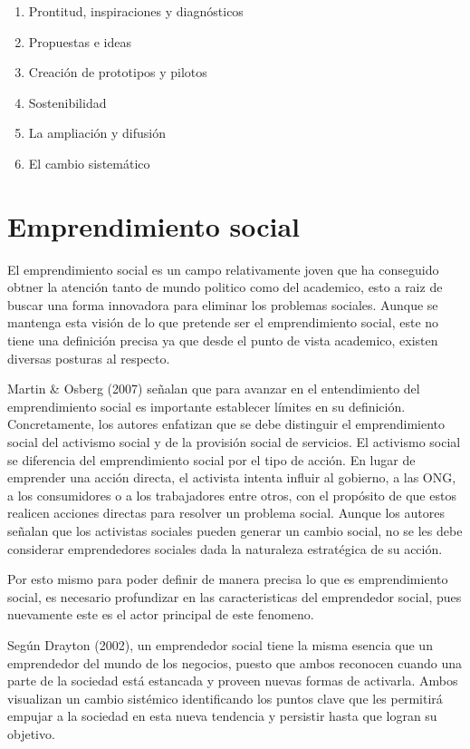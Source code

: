 \documentclass{memoir}
\begin{document}
\begin{enumerate}
\item Prontitud, inspiraciones y diagnósticos
\item Propuestas e ideas
\item Creación de prototipos y pilotos
\item Sostenibilidad
\item La ampliación y difusión
\item El cambio sistemático
\end{enumerate}


\section{Emprendimiento social}
\label{sec:org7efc0e4}

El emprendimiento social es un campo relativamente joven que ha conseguido obtner la atención tanto de mundo politico como del academico, esto a raiz de buscar una forma innovadora para eliminar los problemas sociales. Aunque se mantenga esta visión de lo que pretende ser el emprendimiento social, este no tiene una definición precisa ya que desde el punto de vista academico, existen diversas posturas al respecto.

Martin  \&  Osberg  (2007)  señalan  que  para  avanzar  en  el  entendimiento  del  emprendimiento social es importante establecer límites en su definición. Concretamente, los autores enfatizan que se debe distinguir el emprendimiento social del activismo social y de la provisión social de servicios. El activismo social se diferencia del emprendimiento social por el tipo de acción. En lugar de emprender una acción directa, el activista intenta influir al gobierno, a las ONG, a los consumidores o a los trabajadores entre otros, con el propósito de que estos realicen acciones directas para resolver un problema social. Aunque los autores señalan que los activistas sociales pueden generar un cambio social, no se les debe considerar emprendedores sociales dada la naturaleza estratégica de su acción.

Por esto mismo para poder definir de manera precisa lo que es emprendimiento social, es necesario profundizar en las caracteristicas del emprendedor social, pues nuevamente este es el actor principal de este fenomeno.

Según Drayton (2002), un emprendedor social tiene la misma esencia que un  emprendedor  del  mundo  de  los  negocios,  puesto  que  ambos  reconocen  cuando  una  parte  de  la  sociedad  está  estancada  y  proveen  nuevas  formas  de  activarla.  Ambos  visualizan un cambio sistémico identificando los puntos clave que les permitirá empujar a  la  sociedad  en  esta  nueva  tendencia  y  persistir  hasta  que  logran  su  objetivo. 
\end{document}
